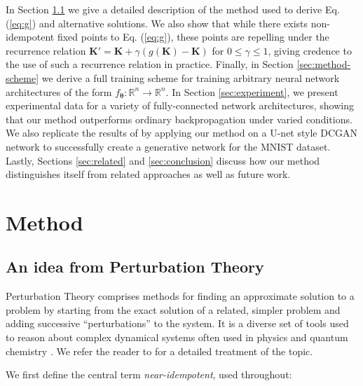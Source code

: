 \documentclass{article}
\theoremstyle{plain}
\theoremstyle{definition}
\theoremstyle{remark}
\newcommand{\vK}{\mathbf{K}}
\newcommand{\vtheta}{\bm{\theta}}
\begin{document}
In Section \ref{sec:method-idea} we give a detailed description of the method used to derive Eq. (\ref{eq:g}) and alternative solutions. We also show that while there exists non-idempotent fixed points to Eq. (\ref{eq:g}), these points are repelling under the recurrence relation ${\vK' = \vK + \gamma(g(\vK) - \vK)}$ for $0 \leq \gamma \leq 1$, giving credence to the use of such a recurrence relation in practice. Finally, in Section \ref{sec:method-scheme} we derive a full training scheme for training arbitrary neural network architectures of the form ${f_{\vtheta}: \mathbb{R}^n \to \mathbb{R}^n}$. In Section \ref{sec:experiment}, we present experimental data for a variety of fully-connected network architectures, showing that our method outperforms ordinary backpropagation under varied conditions. We also replicate the results of \citealt{shocher-ign} by applying our method on a U-net style DCGAN network to successfully create a generative network for the MNIST dataset. Lastly, Sections \ref{sec:related} and \ref{sec:conclusion} discuss how our method distinguishes itself from related approaches as well as future work.

\section{Method}
\label{sec:method}

\subsection{An idea from Perturbation Theory}
\label{sec:method-idea}
Perturbation Theory comprises methods for finding an approximate solution to a problem by starting from the exact solution of a related, simpler problem and adding successive ``perturbations'' to the system. It is a diverse set of tools used to reason about complex dynamical systems often used in physics and quantum chemistry \cite{hirschfelder-dev-perturb}. We refer the reader to \cite{intro-pertub-theory} for a detailed treatment of the topic.

We first define the central term \textit{near-idempotent}, used throughout:
\end{document}
